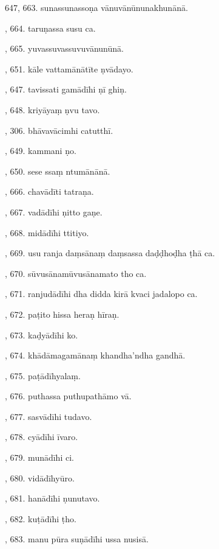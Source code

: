 647, 663. sunassunassoṇa vānuvānūnunakhunānā.\par {}, 664. taruṇassa susu ca.\par {}, 665. yuvassuvassuvuvānunūnā.\par {}, 651. kāle vattamānātīte ṇvādayo.\par {}, 647. tavissati gamādīhi ṇī ghiṇ.\par {}, 648. kriyāyaṃ ṇvu tavo.\par {}, 306. bhāvavācimhi catutthī.\par {}, 649. kammani ṇo.\par {}, 650. sese ssaṃ ntumānānā.\par {}, 666. chavādīti tatraṇa.\par {}, 667. vadādīhi ṇitto gaṇe.\par {}, 668. midādīhi ttitiyo.\par {}, 669. usu ranja daṃsānaṃ daṃsassa daḍḍhoḍha ṭhā ca.\par {}, 670. sūvusānamūvusānamato tho ca.\par {}, 671. ranjudādīhi dha didda kirā kvaci jadalopo ca.\par {}, 672. paṭito hissa heraṇ hīraṇ.\par {}, 673. kaḍyādīhi ko.\par {}, 674. khādāmagamānaṃ khandha’ndha gandhā.\par {}, 675. paṭādīhyalaṃ.\par {}, 676. puthassa puthupathāmo vā.\par {}, 677. sasvādīhi tudavo.\par {}, 678. cyādīhi īvaro.\par {}, 679. munādīhi ci.\par {}, 680. vidādīhyūro.\par {}, 681. hanādīhi ṇunutavo.\par {}, 682. kuṭādīhi ṭho.\par {}, 683. manu pūra suṇādīhi ussa nusisā.\par \noindent

